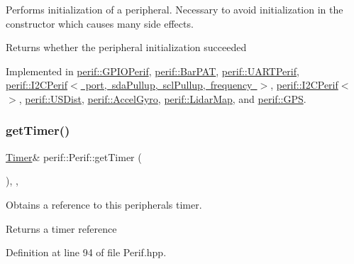 Performs initialization of a peripheral. Necessary to avoid initialization in the constructor which causes many side effects.

\begin{DoxyReturn}{Returns}
whether the peripheral initialization succeeded 
\end{DoxyReturn}


Implemented in \mbox{\hyperlink{classperif_1_1GPIOPerif_a3e94e58e8441b85256567c193164ea69}{perif\+::\+G\+P\+I\+O\+Perif}}, \mbox{\hyperlink{classperif_1_1BarPAT_a591d84e84cfd9ec251d1ff8322e23ebb}{perif\+::\+Bar\+P\+AT}}, \mbox{\hyperlink{classperif_1_1UARTPerif_ac060109ead3a8910fabe57304afe1dbb}{perif\+::\+U\+A\+R\+T\+Perif}}, \mbox{\hyperlink{classperif_1_1I2CPerif_aa91b8eca31223fddd191a50b8a0a526d}{perif\+::\+I2\+C\+Perif$<$ port, sda\+Pullup, scl\+Pullup, frequency $>$}}, \mbox{\hyperlink{classperif_1_1I2CPerif_aa91b8eca31223fddd191a50b8a0a526d}{perif\+::\+I2\+C\+Perif$<$$>$}}, \mbox{\hyperlink{classperif_1_1USDist_a0920535901e083c9832dcde3639ab569}{perif\+::\+U\+S\+Dist}}, \mbox{\hyperlink{classperif_1_1AccelGyro_aebbf13d39d889c298103f16a02b4cce4}{perif\+::\+Accel\+Gyro}}, \mbox{\hyperlink{classperif_1_1LidarMap_a1d0db064c7664aa8014cbd9fe42773ff}{perif\+::\+Lidar\+Map}}, and \mbox{\hyperlink{classperif_1_1GPS_add9ec977f37224c9f2e87c5a932a55bd}{perif\+::\+G\+PS}}.

\mbox{\label{classperif_1_1Perif_a29c48598a861d85256c30e28af67f864}} 
\subsubsection{\texorpdfstring{getTimer()}{getTimer()}}
{\footnotesize\ttfamily \mbox{\hyperlink{classTimer}{Timer}}\& perif\+::\+Perif\+::get\+Timer (\begin{DoxyParamCaption}{ }\end{DoxyParamCaption})\hspace{0.3cm}{\ttfamily [inline]}, {\ttfamily [protected]}, {\ttfamily [inherited]}}

Obtains a reference to this peripheral\textquotesingle{}s timer.

\begin{DoxyReturn}{Returns}
a timer reference 
\end{DoxyReturn}


Definition at line 94 of file Perif.\+hpp.


